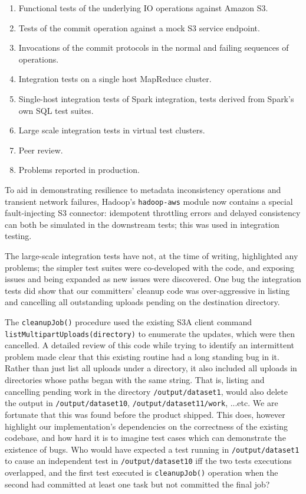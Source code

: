 \documentclass[conference]{IEEEtran}
\begin{document}
\begin{enumerate}
  \item Functional tests of the underlying IO operations against Amazon S3.
  \item Tests of the commit operation against a mock S3 service endpoint.
  \item Invocations of the commit protocols in the normal and failing sequences of operations.
  \item Integration tests on a single host MapReduce cluster.
  \item Single-host integration tests of Spark integration, tests derived from Spark's own SQL test suites.
  \item Large scale integration tests in virtual test clusters.
  \item Peer review.
  \item Problems reported in production.
\end{enumerate}

To aid in demonstrating resilience to metadata inconsistency
operations and transient network failures, Hadoop's \texttt{hadoop-aws} module
now contains a special fault-injecting S3 connector: idempotent throttling errors and
delayed consistency can both be simulated in the downstream tests;
this was used in integration testing.

The large-scale integration tests have not, at the time of writing, highlighted any problems;
the simpler test suites were co-developed with the code, and exposing issues and
being expanded as new issues were discovered.
One bug the integration tests did show that our committers' cleanup code was
over-aggressive in listing and cancelling all outstanding uploads pending
on the destination directory.


The \texttt{cleanupJob()} procedure used the existing S3A client command
\texttt{listMultipartUploads(directory)} to enumerate the updates,
which were then cancelled.
A detailed review of this code while trying to identify an intermittent problem
made clear that this existing routine had a long standing bug in it.
Rather than just list all uploads under a directory, it also included
all uploads in directories whose paths began with the same string.
That is, listing and cancelling pending work in the directory \texttt{/output/dataset1},
would also delete the output in \texttt{/output/dataset10}, \texttt{/output/dataset11/work},
...etc.
We are fortunate that this was found before the product shipped.
This does, however highlight our implementation's dependencies on the correctness
of the existing codebase, and how hard it is to imagine test cases which
can demonstrate the existence of bugs.
Who would have expected a test running in \texttt{/output/dataset1} to
cause an independent test in \texttt{/output/dataset10} iff the two tests
executions overlapped, and the first test executed is \texttt{cleanupJob()}
operation when the second had committed at least one task but not committed
the final job?
\end{document}
